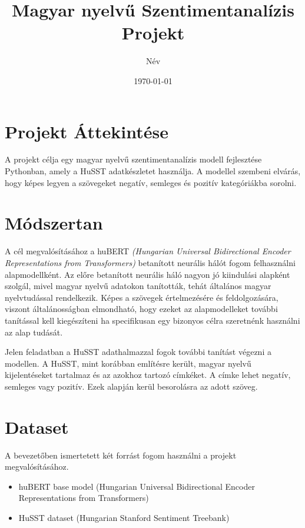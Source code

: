 \documentclass[12pt]{article}
\title{Magyar nyelvű Szentimentanalízis Projekt}
\author{Név}
\date{\today}
\begin{document}
\maketitle
\newpage

\tableofcontents
\newpage

\section{Projekt Áttekintése}

A projekt célja egy magyar nyelvű szentimentanalízis modell fejlesztése Pythonban, amely a HuSST adatkészletet használja. A modellel szembeni elvárás, hogy képes legyen a szövegeket negatív, semleges és pozitív kategóriákba sorolni.

\section{Módszertan}

A cél megvalósításához a huBERT \textit{(Hungarian Universal Bidirectional Encoder Representations from Transformers)} betanított neurális hálót fogom felhasználni alapmodellként. Az előre betanított neurális háló nagyon jó kiindulási alapként szolgál, mivel magyar nyelvű adatokon tanították, tehát általános magyar nyelvtudással rendelkezik. Képes a szövegek értelmezésére és feldolgozására, viszont általánosságban elmondható, hogy ezeket az alapmodelleket további tanítással kell kiegészíteni ha specifikusan egy bizonyos célra szeretnénk használni az alap tudását.

Jelen feladatban a HuSST adathalmazzal fogok további tanítást végezni a modellen. A HuSST, mint korábban említésre került, magyar nyelvű kijelentéseket tartalmaz és az azokhoz tartozó címkéket. A címke lehet negatív, semleges vagy pozitív. Ezek alapján kerül besorolásra az adott szöveg. 

\section{Dataset}

A bevezetőben ismertetett két forrást fogom használni a projekt megvalósításához.

\begin{itemize}
    \item huBERT base model (Hungarian Universal Bidirectional Encoder Representations from Transformers)
    \item HuSST dataset (Hungarian Stanford Sentiment Treebank)
\end{itemize}
\end{document}
